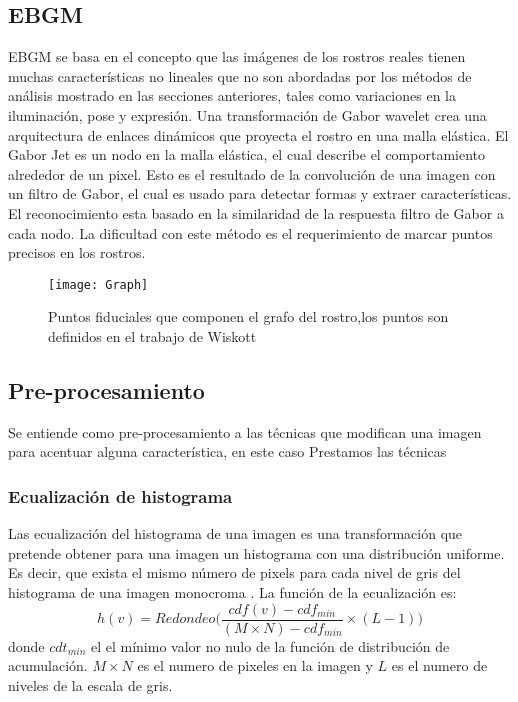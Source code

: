 \subsection{\ac{EBGM}}
\ac{EBGM} \cite{wiskott1997face} se basa en el concepto que las imágenes de los rostros reales tienen muchas características no lineales que no son abordadas por los métodos de análisis mostrado en las secciones anteriores, tales como variaciones en la iluminación, pose y expresión. Una transformación de Gabor wavelet crea una arquitectura de enlaces dinámicos que proyecta el rostro en una malla elástica.
El Gabor Jet es un nodo en la malla elástica, el cual describe el comportamiento alrededor de un pixel. Esto es el resultado de la convolución de una imagen con un filtro de Gabor, el cual es usado
para detectar formas y extraer características.
El reconocimiento esta basado en la similaridad de la respuesta filtro de Gabor a cada nodo. La dificultad con este método es el requerimiento de marcar puntos precisos en los rostros.
\begin{figure}[h]
	\center
    \label{Grafo}
	\texttt{[image: Graph]}
    \caption{Puntos fiduciales que componen el grafo del rostro,los puntos son definidos en el trabajo de Wiskott \cite{wiskott1997face}}
\end{figure}

\subsection{Pre-procesamiento}
Se entiende como pre-procesamiento a las técnicas que modifican una imagen para acentuar alguna característica, en este caso Prestamos las técnicas  
\subsubsection{Ecualización de histograma}
Las ecualización del histograma de una imagen es una transformación que pretende obtener para una imagen un histograma con una distribución uniforme. Es decir, que exista el mismo número de pixels para cada nivel de gris del histograma de una imagen monocroma \cite{orlova2002image}.
La función de la ecualización es:
\[h(v)=Redondeo\Bigg(\frac{cdf(v)-cdf_{min}}{(M\times N)-cdf_{min}} \times (L-1)\Bigg)\]
donde $cdt_{min}$ el el mínimo valor no nulo de la función de distribución de acumulación. $M\times N$ es el numero de pixeles en la imagen y $L$ es el numero de niveles de la escala de gris.
